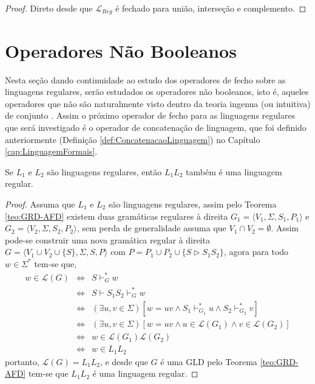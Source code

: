 \begin{proof}
	Direto desde que $\mathcal{L}_{Reg}$ é fechado para união, interseção e complemento.
\end{proof}

\section{Operadores Não Booleanos}

Nesta seção dando continuidade ao estudo dos operadores de fecho sobre as linguagens regulares, serão estudados os operadores não booleanos, isto é, aqueles operadores que não são naturalmente visto dentro da teoria ingenua (ou intuitiva) de conjunto \cite{abe1991-TC, lipschutz1978-TC}. Assim o próximo operador de fecho para as linguagens regulares que será investigado é o operador de concatenação de linguagem, que foi definido anteriormente (Definição \ref{def:ConcatenacaoLinguagem}) no Capítulo \ref{cap:LinguagemFormais}.

\begin{theorem}\label{teo:FechoConcatenacaoRegular}
	Se $L_1$ e $L_2$ são linguagens regulares, então $L_1L_2$ também é uma linguagem regular.
\end{theorem}

\begin{proof}
	Assuma que $L_1$ e $L_2$ são linguagens regulares, assim pelo Teorema \ref{teo:GRD-AFD} existem duas gramáticas regulares à direita $G_1 = \langle V_1, \Sigma, S_1, P_1 \rangle$ e $G_2 = \langle V_2, \Sigma, S_2, P_2 \rangle$, sem perda de generalidade assuma que $V_1 \cap V_2 = \emptyset$. Assim pode-se construir uma nova gramática regular à direita $G = \langle V_1 \cup V_2 \cup \{S\}, \Sigma, S, P\rangle$ com $P = P_1 \cup P_2 \cup \{S \rhd S_1S_2\}$, agora para todo $w \in \Sigma^*$ tem-se que,
	\begin{eqnarray*}
		w \in \mathcal{L}(G) & \Longleftrightarrow & S \vdash^*_G w\\
		& \Longleftrightarrow & S \vdash S_1S_2 \vdash^*_G w\\
		& \Longleftrightarrow & (\exists u, v \in \Sigma)[w = uv \land S_1 \vdash^*_{G_1} u \land S_2 \vdash^*_{G_2} v]\\
		& \Longleftrightarrow & (\exists u, v \in \Sigma)[w = uv \land u \in \mathcal{L}(G_1) \land v \in \mathcal{L}(G_2)]\\
		& \Longleftrightarrow &  w \in \mathcal{L}(G_1) \mathcal{L}(G_2)\\
		& \Longleftrightarrow &  w \in L_1L_2
	\end{eqnarray*}
	portanto, $\mathcal{L}(G) = L_1L_2$, e desde que $G$ é uma GLD pelo Teorema \ref{teo:GRD-AFD} tem-se que $L_1L_2$ é uma linguagem regular.
\end{proof}

